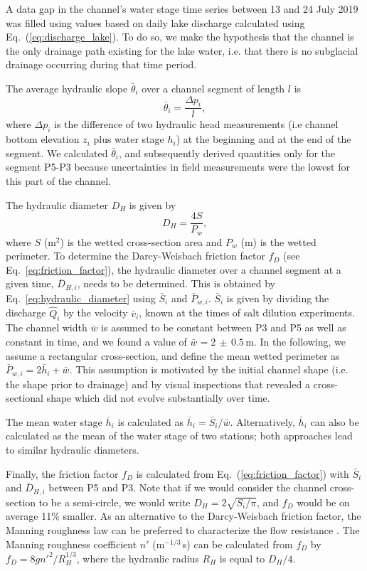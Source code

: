 A data gap in the channel's water stage time series between 13 and 24 July 2019 was filled using values based on daily lake discharge calculated using Eq.~(\ref{eq:discharge_lake}). To do so, we make the hypothesis that the channel is the only drainage path existing for the lake water, i.e. that there is no subglacial drainage occurring during that time period.

The average hydraulic slope $\bar \theta_i$ over a channel segment of length $l$ is
%
\begin{equation}\label{eq:head_loss}
\bar \theta_i = \frac{\Delta p_i}{l},
\end{equation}
%
where $\Delta p_i$ is the difference of two hydraulic head measurements (i.e channel bottom elevation $z_i$ plus water stage $h_i$) at the beginning and at the end of the segment. We calculated $\bar \theta_i$, and subsequently derived quantities only for the segment P5-P3 because uncertainties in field measurements were the lowest for this part of the channel.

The hydraulic diameter $D_H$ is given by
%
\begin{equation}\label{eq:hydraulic_diameter}
D_H = \frac{4S}{P_w},
\end{equation}
%
where $S$ (m$^2$) is the wetted cross-section area and $P_w$ (m) is the wetted perimeter. To determine the Darcy-Weisbach friction factor $f_D$ (see Eq.~\ref{eq:friction_factor}),  the hydraulic diameter over a channel segment at a given time, $\bar D_{H,i}$, needs to be determined. This is obtained by Eq.~\ref{eq:hydraulic_diameter} using $\bar S_i$ and $\bar P_{w,i}$. $\bar S_i$ is given by dividing the discharge $\hat Q_i$ by the velocity $\bar v_i$, known at the times of salt dilution experiments. The channel width $\bar w$ is assumed to be constant between P3 and P5 as well as constant in time, and we found a value of $\bar w = 2\,\pm\,0.5$\,m. In the following, we assume a rectangular cross-section, and define the mean wetted perimeter as $\bar P_{w,i} = 2\bar h_i + \bar w$. This assumption is motivated by the initial channel shape (i.e. the shape prior to drainage) and by visual inspections that revealed a cross-sectional shape which did not evolve substantially over time.

The mean water stage $\bar h_i$ is calculated as $\bar h_i = \bar S_i/\bar w$. Alternatively, $\bar h_i$ can also be calculated as the mean of the water stage of two stations; both approaches lead to similar hydraulic diameters.

Finally, the friction factor $f_D$ is calculated from Eq.~(\ref{eq:friction_factor}) with $\bar S_i$ and $\bar D_{H,i}$ between P5 and P3. Note that if we would consider the channel cross-section to be a semi-circle, we would write $D_H = 2\sqrt{S_i/\pi}$, and $f_D$ would be on average 11\% smaller.
As an alternative to the Darcy-Weisbach friction factor, the Manning roughness law can be preferred to characterize the flow resistance \citep{Clarke2003}. The Manning roughness coefficient $n'$ (m$^{-1/3}$\,s) can be calculated from $f_D$ by $f_D = 8gn'^2/R_H^{1/3}$, where the hydraulic radius $R_H$ is equal to $D_H/4$.

